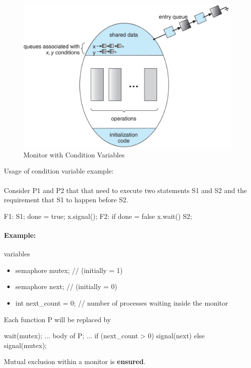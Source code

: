 \begin{figure}[htbp]
    \centering
    \includegraphics[width=0.6\linewidth]{img/condition_monitors.png}
    \caption{Monitor with Condition Variables}
\end{figure}

Usage of condition variable example:
\paragraph{}
Consider P1 and P2 that that need to execute two statements S1 and S2 and the requirement that S1 to happen before S2.

\begin{codeInC}
F1:
    S1;
    done = true;
    x.signal();
F2:
    if done = false
    x.wait()
    S2;
\end{codeInC}


\paragraph{Example: } variables 

\begin{itemize}
    \item[] semaphore mutex; // (initially = 1)
    \item[] semaphore next; // (initially = 0)
    \item[] int next\_count = 0; // number of processes waiting inside the monitor
\end{itemize}

Each function P will be replaced by

\begin{codeInC}
wait(mutex);
    ...
body of P;
    ...
if (next_count > 0)
    signal(next)
else
    signal(mutex);
\end{codeInC}

Mutual exclusion within a monitor is \textbf{ensured}.

\paragraph{}

